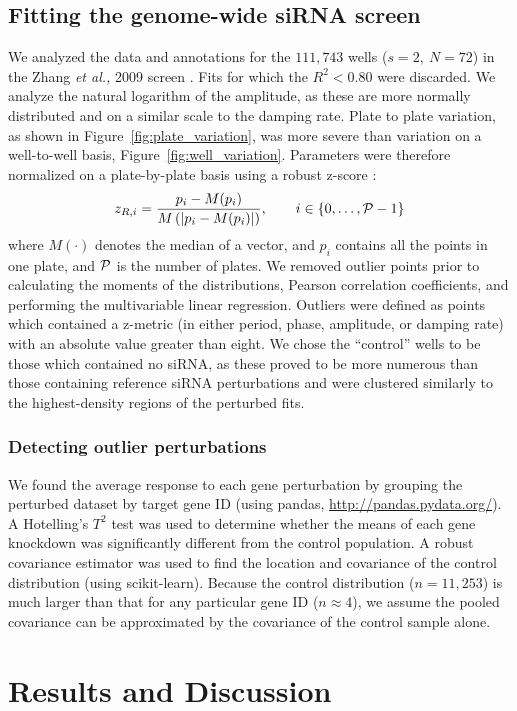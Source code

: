 \documentclass[11pt, letterpaper]{article}
\begin{document}
\subsection*{Fitting the genome-wide siRNA screen}
We analyzed the data and annotations for the $111,743$ wells ($s=2,\ N=72$) in the Zhang {\itshape et al.,} 2009 screen \cite{Zhang2009}.
Fits for which the $R^2 < 0.80$ were discarded.
We analyze the natural logarithm of the amplitude, as these are more normally distributed and on a similar scale to the damping rate.
Plate to plate variation, as shown in Figure~\ref{fig:plate_variation}, was more severe than variation on a well-to-well basis, Figure~\ref{fig:well_variation}.
Parameters were therefore normalized on a plate-by-plate basis using a robust z-score \cite{Birmingham2009}:
\[
  z_{R,i} = \frac{p_i - M(p_i)}{M\left(\left|p_i - M(p_i)\right|\right)}, \qquad i \in \{0, \dots, {\cal P} - 1 \}
\]
where $M(\cdot)$ denotes the median of a vector, and $p_i$ contains all the points in one plate, and $\cal P$ is the number of plates.
We removed outlier points prior to calculating the moments of the distributions, Pearson correlation coefficients, and performing the multivariable linear regression.
Outliers were defined as points which contained a z-metric (in either period, phase, amplitude, or damping rate) with an absolute value greater than eight.
We chose the ``control'' wells to be those which contained no siRNA, as these proved to be more numerous than those containing reference siRNA perturbations and were clustered similarly to the highest-density regions of the perturbed fits.

\subsubsection*{Detecting outlier perturbations}
We found the average response to each gene perturbation by grouping the perturbed dataset by target gene ID (using pandas, \url{http://pandas.pydata.org/}).
A Hotelling's $T^2$ test was used to determine whether the means of each gene knockdown was significantly different from the control population.
A robust covariance estimator was used to find the location and covariance of the control distribution (using scikit-learn).
Because the control distribution ($n=11,253$) is much larger than that for any particular gene ID ($n \approx 4$), we assume the pooled covariance can be approximated by the covariance of the control sample alone.

\section*{Results and Discussion}
\end{document}
